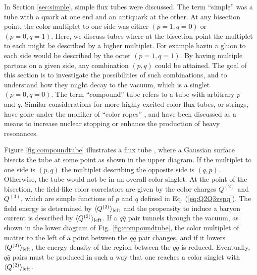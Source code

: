 \documentclass[aps, prc, 12pt, nofootinbib, showpacs, superscriptaddress, tightenlines, groupedaddress]{revtex4-2}
\begin{document}
In Section \ref{sec:simple}, simple flux tubes were discussed. The term ``simple'' was a tube with a quark at one end and an antiquark at the other. At any bisection point, the color multiplet to one side was either $(p=1,q=0)$ or $(p=0,q=1)$. Here, we discuss tubes where at the bisection point the multiplet to each might be described by a higher multiplet. For example havin a gluon to each side would be described by the octet $(p=1,q=1)$. By having multiple partons on a given side, any combination $(p,q)$ could be attained. The goal of this section is to investigate the possibilities of such combinations, and to understand how they might decay to the vacuum, which is a singlet $(p=0,q=0)$. The term ``compound'' tube refers to a tube with arbitrary $p$ and $q$. Similar considerations for more highly excited color flux tubes, or strings, have gone under the moniker of ``color ropes'' \cite{Sorge:1995dp,Goswami:2019mta}, and have been discussed as a means to increase nuclear stopping or enhance the production of heavy resonances.

Figure \ref{fig:compoundtube} illustrates a flux tube , where a Gaussian surface bisects the tube at some point as shown in the upper diagram. If the multiplet to one side is $(p,q)$ the multiplet describing the opposite side is $(q,p)$. Otherwise, the tube would not be in an overall color singlet. At the point of the bisection, the field-like color correlators are given by the color charges $Q^{(2)}$ and $Q^{(3)}$, which are simple functions of $p$ and $q$ defined in Eq. (\ref{eq:Q2Q3vspq}). The field energy is determined by $\langle Q^{(2)}\rangle_{\rm left}$ and the propensity to induce a baryon current is described by $\langle Q^{(3)}\rangle_{\rm left}$. If a $q\bar{q}$ pair tunnels through the vacuum, as shown in the lower diagram of Fig. \ref{fig:compoundtube}, the color multiplet of matter to the left of a point between the $q\bar{q}$ pair changes, and if it lowers $\langle Q^{(2)}\rangle_{\rm left}$, the energy density of the region between the $q\bar{q}$ is reduced. Eventually, $q\bar{q}$ pairs must be produced in such a way that one reaches a color singlet with $\langle Q^{(2)}\rangle_{\rm left}$.
\end{document}

